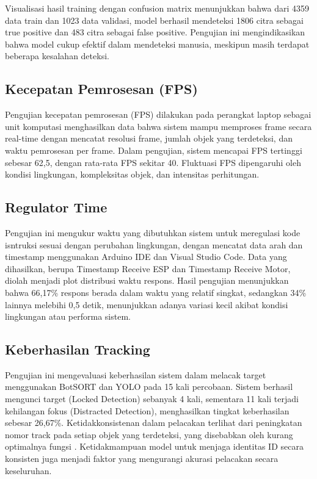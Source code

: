 Visualisasi hasil training dengan confusion matrix menunjukkan bahwa dari 4359 data train dan 1023 data validasi, model berhasil mendeteksi 1806 citra sebagai true positive dan 483 citra sebagai false positive. Pengujian ini mengindikasikan bahwa model cukup efektif dalam mendeteksi manusia, meskipun masih terdapat beberapa kesalahan deteksi.

\subsection{Kecepatan Pemrosesan (FPS)}
\label{sec:kecepatanpemrosesan}

Pengujian kecepatan pemrosesan (FPS) dilakukan pada perangkat laptop sebagai unit komputasi menghasilkan data bahwa sistem mampu memproses frame secara real-time dengan mencatat resolusi frame, jumlah objek yang terdeteksi, dan waktu pemrosesan per frame. Dalam pengujian, sistem mencapai FPS tertinggi sebesar 62,5, dengan rata-rata FPS sekitar 40. Fluktuasi FPS dipengaruhi oleh kondisi lingkungan, kompleksitas objek, dan intensitas perhitungan.

\subsection{Regulator Time}
\label{sec:regulatortime}

Pengujian ini mengukur waktu yang dibutuhkan sistem untuk meregulasi kode isntruksi sesuai dengan perubahan lingkungan, dengan mencatat data arah dan timestamp menggunakan Arduino IDE dan Visual Studio Code. Data yang dihasilkan, berupa Timestamp Receive ESP dan Timestamp Receive Motor, diolah menjadi plot distribusi waktu respons. Hasil pengujian menunjukkan bahwa 66,17\% respons berada dalam waktu yang relatif singkat, sedangkan 34\% lainnya melebihi 0,5 detik, menunjukkan adanya variasi kecil akibat kondisi lingkungan atau performa sistem.

\subsection{Keberhasilan Tracking}
\label{sec:performatracking}

Pengujian ini mengevaluasi keberhasilan sistem dalam melacak target menggunakan BotSORT dan YOLO pada 15 kali percobaan. Sistem berhasil mengunci target (Locked Detection) sebanyak 4 kali, sementara 11 kali terjadi kehilangan fokus (Distracted Detection), menghasilkan tingkat keberhasilan sebesar 26,67\%. Ketidakkonsistenan dalam pelacakan terlihat dari peningkatan nomor track pada setiap objek yang terdeteksi, yang disebabkan oleh kurang optimalnya fungsi . Ketidakmampuan model untuk menjaga identitas ID secara konsisten juga menjadi faktor yang mengurangi akurasi pelacakan secara keseluruhan.

